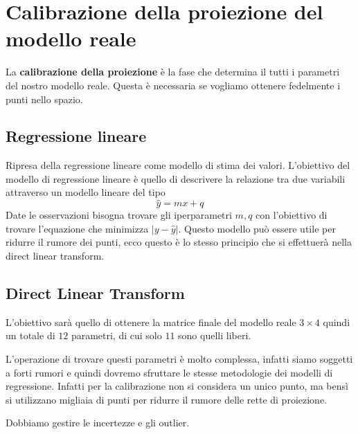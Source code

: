\section{Calibrazione della proiezione del modello reale}
La \textbf{calibrazione della proiezione} è la fase che determina il tutti i 
parametri del nostro modello reale. Questa è necessaria se vogliamo ottenere fedelmente 
i punti nello spazio.

\subsection{Regressione lineare}
Ripresa della regressione lineare come modello di stima dei valori.
L'obiettivo del modello di regressione lineare è quello di descrivere la relazione 
tra due variabili attraverso un modello lineare del tipo 
$$\hat{y} = mx + q$$
Date le osservazioni bisogna trovare gli iperparametri $m, q$ con l'obiettivo 
di trovare l'equazione che minimizza $|y - \hat{y}|$. Questo modello può essere utile 
per ridurre il rumore dei punti, ecco questo è lo stesso principio che si effettuerà 
nella direct linear transform. 

\subsection{Direct Linear Transform} 
L'obiettivo sarà quello di ottenere la matrice finale del modello reale $3\times 4$
quindi un totale di $12$ parametri, di cui solo $11$ sono quelli liberi. 

L'operazione di trovare questi parametri è molto complessa, infatti siamo soggetti 
a forti rumori e quindi dovremo sfruttare le stesse metodologie dei modelli di 
regressione. Infatti per la calibrazione non si considera un unico punto, ma bensì
si utilizzano migliaia di punti per ridurre il rumore delle rette di proiezione.

Dobbiamo gestire le incertezze e gli outlier.
